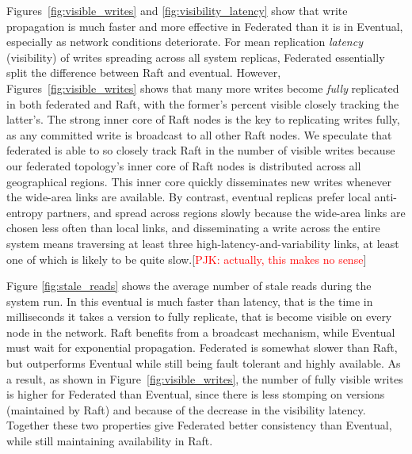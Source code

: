 \documentclass[10pt,conference,letterpaper]{IEEEtran}
\newcommand{\todo}[1]{{\textcolor{red}{#1}}}
\newcommand{\pjk}[1]{[\todo{PJK: #1}]}
\begin{document}

Figures~\ref{fig:visible_writes} and \ref{fig:visibility_latency} show that write
propagation is much faster and more effective in Federated than it is in Eventual,
especially as network conditions deteriorate.
For mean replication \emph{latency} (visibility) of writes spreading across all system
replicas, Federated essentially split the difference between Raft and eventual.
However, Figures~\ref{fig:visible_writes} shows that many more writes become \emph{fully}
replicated in both federated and Raft, with the former's percent visible closely tracking
the latter's.
The strong inner core of Raft nodes is the key to replicating writes fully, as any
committed write is broadcast to all other Raft nodes.
We speculate that federated is able to so closely track Raft in the number of visible
writes because our federated topology's inner core of Raft nodes is distributed across all
geographical regions.
This inner core quickly disseminates new writes whenever the wide-area links are
available.
By contrast, eventual replicas prefer local anti-entropy partners, and spread across
regions slowly because the wide-area links are chosen less often than local links, and
disseminating a write across the entire system means traversing at least three
high-latency-and-variability links, at least one of which is likely to be quite
slow.\pjk{actually, this makes no sense}

Figure \ref{fig:stale_reads} shows the average number of stale reads during the system
run. In this eventual is much faster than
latency, that is the time in milliseconds it takes a version to fully
replicate, that is become visible on every node in the network.
Raft benefits from a broadcast mechanism, while Eventual must wait for
exponential propagation.
Federated is somewhat slower than Raft, but outperforms Eventual while
still being fault tolerant and highly available.
As a result, as shown in Figure~\ref{fig:visible_writes}, the number
of fully visible writes is higher for Federated than Eventual, since
there is less stomping on versions (maintained by Raft) and because of
the decrease in the visibility latency.
Together these two properties give Federated better consistency than
Eventual, while still maintaining availability in Raft.
\end{document}
